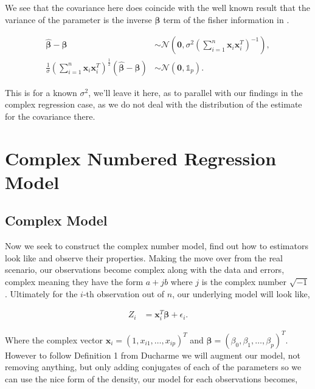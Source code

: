 \documentclass[honours,12pt]{unswthesis}
\numberwithin{equation}{section}
\begin{document}
We see that the covariance here does coincide with the well known result that the variance of the parameter is the inverse $\bm{\beta}$ term of the fisher information in .

\begin{align*}
	\widehat{\bm{\beta}} - \bm{\beta} &\sim \mathcal{N} \left( \mathbf{0}, \sigma^{2} \left( \sum_{i = 1}^{n} \mathbf{x}_{i} \mathbf{x}_{i}^{T} \right)^{-1} \right), \\
	\frac{1}{\sigma} \left( \sum_{i = 1}^{n} \mathbf{x}_{i} \mathbf{x}_{i}^{T} \right)^{\frac{1}{2}} \left( \widehat{\bm{\beta}} - \bm{\beta} \right) &\sim \mathcal{N} \left( \mathbf{0}, \mathbb{1}_{p} \right).
\end{align*}

\noindent This is for a known $\sigma^{2}$, we'll leave it here, as to parallel with our findings in the complex regression case, as we do not deal with the distribution of the estimate for the covariance there.

\chapter{Complex Numbered Regression Model}

\section{Complex Model}

Now we seek to construct the complex number model, find out how to estimators look like and observe their properties. Making the move over from the real scenario, our observations become complex along with the data and errors, complex meaning they have the form $a+jb$ where $j$ is the complex number $\sqrt{-1}$. Ultimately for the $i$-th observation out of $n$, our underlying model will look like,

\begin{align*}
	Z_{i} &= \mathbf{x}_{i}^{T}\bm{\beta} + \epsilon_{i}.
\end{align*}

\noindent Where the complex vector $\mathbf{x}_{i} = \left( 1, x_{i1},  \hdots , x_{ip} \right)^{T}$ and $\bm{\beta} = \left( \beta_{0}, \beta_{1},  \hdots,  \beta_{p}\right)^{T}$. However to follow Definition 1 from Ducharme \cite{ducharme2016} we will augment our model, not removing anything, but only adding conjugates of each of the parameters so we can use the nice form of the density, our model for each observations becomes,
\end{document}
